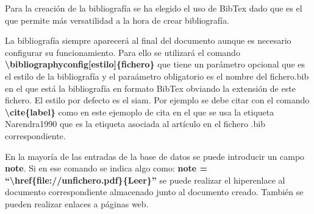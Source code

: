 Para la creación de la bibliografía se ha elegido el uso de BibTex dado que es el que permite más versatilidad a la hora de crear bibliografía.

La bibliografía siempre aparecerá al final del documento aunque es necesario configurar su funcionamiento. Para ello se utilizará el comando \textbf{\textbackslash bibliographyconfig[estilo]\{fichero\}} que tiene un parámetro opcional que es el estilo de la bibliografía y el paraámetro obligatorio es el nombre del fichero.bib en el que está la bibliografía en formato BibTex obviando la extensión de este fichero. El estilo por defecto es el siam. Por ejemplo se debe citar con el comando \textbf{\textbackslash cite\{label\}} como en este ejemoplo de cita\cite{Narendra1990} en el que se usa la etiqueta Narendra1990 que es la etiqueta asociada al artículo en el fichero .bib correspondiente.

En la mayoría de las entradas de la base de datos se puede introducir un campo \textbf{note}. Si en ese comando se indica algo como:
\textbf{note = ``{\textbackslash}href\{file://unfichero.pdf\}\{Leer\}''}
se puede realizar el hiperenlace al documento correspondiente almacenado junto al documento creado. También se pueden realizar enlaces a páginas web\cite{Zurek:1993}.
